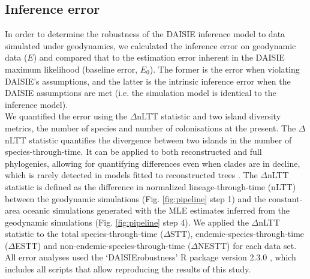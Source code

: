 \documentclass{article}
\begin{document}
\subsection*{Inference error}

In order to determine the robustness of the DAISIE inference model to data simulated under geodynamics, we calculated the inference error on geodynamic data ($E$) and compared that to the estimation error inherent in the DAISIE maximum likelihood (baseline error, $E_0$). The former is the error when violating DAISIE’s assumptions, and the latter is the intrinsic inference error when the DAISIE assumptions are met (i.e. the simulation model is identical to the inference model). \\

We quantified the error using the $\Delta$nLTT statistic \citep{janzen_approximate_2015} and two island diversity metrics, the number of species and number of colonisations at the present. The $\Delta$nLTT statistic quantifies the divergence between two islands in the number of species-through-time. It can be applied to both reconstructed and full phylogenies, allowing for quantifying differences even when clades are in decline, which is rarely detected in models fitted to reconstructed trees \citep{burin_how_2019}. The $\Delta$nLTT statistic is defined as the difference in normalized lineage-through-time (nLTT) between the geodynamic simulations (Fig. \ref{fig:pipeline} step 1) and the constant-area oceanic simulations generated with the MLE estimates inferred from the geodynamic simulations (Fig. \ref{fig:pipeline} step 4). We applied the $\Delta$nLTT statistic to the total species-through-time ($\Delta$STT), endemic-species-through-time ($\Delta$ESTT) and non-endemic-species-through-time ($\Delta$NESTT) for each data set. All error analyses used the `DAISIErobustness' R package version 2.3.0 \citep{lambert_joshua_w_2021_5119973}, which includes all scripts that allow reproducing the results of this study.

\clearpage
\end{document}
